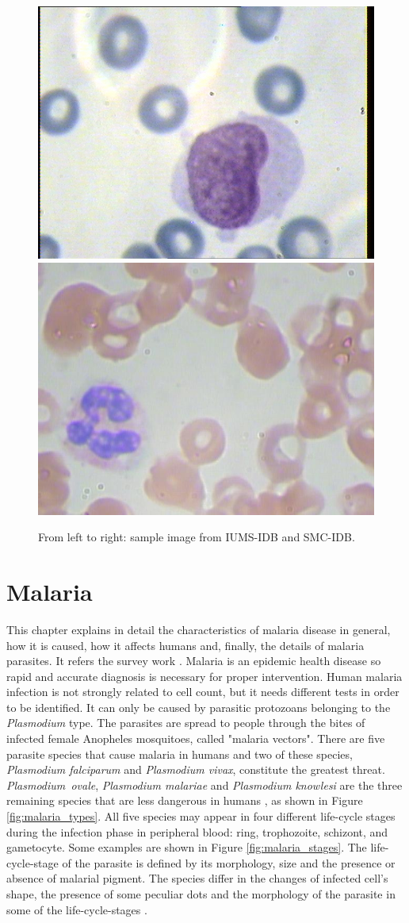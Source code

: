 \begin{figure}[h]
	\centering
	\includegraphics[height=0.33\textwidth]{images/2016_1_mva/IUMS}
	\includegraphics[height=0.33\textwidth]{images/2016_1_mva/SMC}
	\caption[IUMS-IDB and SMC-IDB samples.]{\label{fig:datasets_samples}From left to right: sample image from IUMS-IDB and SMC-IDB.}
\end{figure}

\newpage
\section{Malaria}
\label{malaria_survey}
This chapter explains in detail the characteristics of malaria disease in general, how it is caused, how it affects humans and, finally, the details of malaria parasites. It refers the survey work \cite{Loddo2018}.
Malaria is an epidemic health disease so rapid and accurate diagnosis is necessary for proper intervention. 
Human malaria infection is not strongly related to cell count, but it needs different tests in order to be identified. It can only be caused by parasitic protozoans belonging to the \emph{Plasmodium} type. The parasites are spread to people through the bites of infected female Anopheles mosquitoes, called "malaria vectors".
There are five parasite species that cause malaria in humans and two of these species, \emph{Plasmodium falciparum} and \emph{Plasmodium vivax}, constitute the greatest threat. \emph{Plasmodium~ovale}, \emph{Plasmodium malariae} and \emph{Plasmodium knowlesi} are the three remaining species that are less dangerous in humans \cite{WHO_dec_2016}, as shown in Figure \ref{fig:malaria_types}.
All five species may appear in four different life-cycle stages during the infection phase in peripheral blood: ring, trophozoite, schizont, and gametocyte. Some examples are shown in Figure \ref{fig:malaria_stages}.
The life-cycle-stage of the parasite is defined by its morphology, size and the presence or absence of malarial pigment.
The species differ in the changes of infected cell's shape, the presence of some peculiar dots and the morphology of the parasite in some of the life-cycle-stages \cite{Somasekar2011}.

